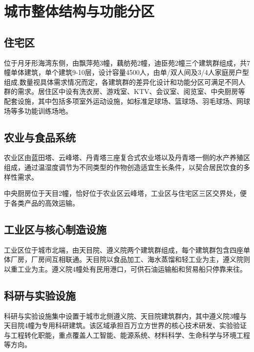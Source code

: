 \chapter{城市整体结构与功能分区}\label{ux57ceux5e02ux6574ux4f53ux7ed3ux6784ux4e0eux529fux80fdux5206ux533a}

\section{住宅区}\label{ux4f4fux5b85ux533a}

位于月牙形海湾东侧，由飘萍苑3幢，藕舫苑2幢，迪臣苑2幢三个建筑群组成，共7幢单体建筑，单个建筑9-10层，设计容量4500人，由单/双人间及3/4人家庭房户型组成,数量视具体需求情况而定，各建筑群的差异化设计和功能分区可满足不同人群的需求。居住区中设有洗衣房、游戏室、KTV、会议室、阅览室、中央厨房等配套设施，其中包括多项室外运动设施，如标准足球场、篮球场、羽毛球场、网球场等多功能训练场地。

\section{农业与食品系统}\label{ux519cux4e1aux4e0eux98dfux54c1ux7cfbux7edf}

农业区由蓝田塔、云峰塔、丹青塔三座复合式农业塔以及丹青塔一侧的水产养殖区组成，通过温湿度调节为不同类型的作物创造适宜生长条件，以契合居民饮食的多样性需求。

中央厨房位于天目2幢，恰好位于农业区云峰塔，工业区与住宅区三区交界处，便于各类产品的高效运输。

\section{工业区与核心制造设施}\label{ux5de5ux4e1aux533aux4e0eux6838ux5fc3ux5236ux9020ux8bbeux65bd}

工业区位于城市北端，由天目院、遵义院两个建筑群组成，每个建筑群包含四座单体厂房，厂房间互相联通。天目院以食品加工、海水蒸馏和轻工业为主，遵义院则以重工业为主。遵义院4幢处有民用港口，可供石油运输船和贸易船只停靠来往。

\section{科研与实验设施}\label{ux79d1ux7814ux4e0eux5b9eux9a8cux8bbeux65bd}

科研与实验设施集中设置于城市北侧遵义院、天目院建筑群内，其中遵义院3幢与天目院4幢为专用科研建筑。该区域承担百万立方世界的核心技术研发、实验验证与工程转化职能，重点覆盖人工智能、能源系统、材料科学、生命科学与环境工程等方向。

